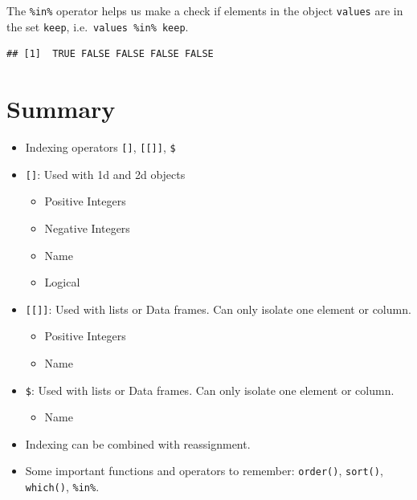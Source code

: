 \documentclass[
]{book}
\newenvironment{Shaded}{\begin{snugshade}}{\end{snugshade}}
\newcommand{\CommentTok}[1]{\textcolor[rgb]{0.56,0.35,0.01}{\textit{#1}}}
\newcommand{\KeywordTok}[1]{\textcolor[rgb]{0.13,0.29,0.53}{\textbf{#1}}}
\newcommand{\NormalTok}[1]{#1}
\newcommand{\OperatorTok}[1]{\textcolor[rgb]{0.81,0.36,0.00}{\textbf{#1}}}
\newcommand{\StringTok}[1]{\textcolor[rgb]{0.31,0.60,0.02}{#1}}
\providecommand{\tightlist}{%
  \setlength{\itemsep}{0pt}\setlength{\parskip}{0pt}}
\begin{document}
The \texttt{\%in\%} operator helps us make a check if elements in the object \texttt{values} are in the set \texttt{keep}, i.e.~\texttt{values\ \%in\%\ keep}.

\begin{Shaded}
\end{Shaded}

\begin{verbatim}
## [1]  TRUE FALSE FALSE FALSE FALSE
\end{verbatim}

\hypertarget{summary-3}{%
\section*{Summary}\label{summary-3}}

\begin{itemize}
\item
  Indexing operators \texttt{{[}{]}}, \texttt{{[}{[}{]}{]}}, \texttt{\$}
\item
  \texttt{{[}{]}}: Used with 1d and 2d objects

  \begin{itemize}
  \tightlist
  \item
    Positive Integers
  \item
    Negative Integers
  \item
    Name
  \item
    Logical
  \end{itemize}
\item
  \texttt{{[}{[}{]}{]}}: Used with lists or Data frames. Can only isolate one element or column.

  \begin{itemize}
  \tightlist
  \item
    Positive Integers
  \item
    Name
  \end{itemize}
\item
  \texttt{\$}: Used with lists or Data frames. Can only isolate one element or column.

  \begin{itemize}
  \tightlist
  \item
    Name
  \end{itemize}
\item
  Indexing can be combined with reassignment.
\item
  Some important functions and operators to remember: \texttt{order()}, \texttt{sort()}, \texttt{which()}, \texttt{\%in\%}.
\end{itemize}
\end{document}
